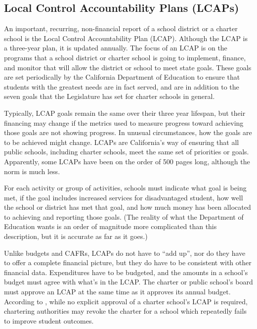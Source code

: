 \subsection{Local Control Accountability Plans (LCAPs)}\label{sec:lcaps}\indent%

An important, recurring, non-financial report of a school district or a charter school is the Local Control Accountability Plan (LCAP).
 Although the LCAP is a three-year plan, it is updated annually. The focus of an LCAP is on the programs that a school district or charter school is going to implement, finance, and monitor that will allow the district or school to meet state goals. These goals are set periodically by the California Department of Education to ensure that students with the greatest needs are in fact served, and are in addition to the seven goals that the Legislature has set for charter schools in general.

Typically, LCAP goals remain the same over their three year lifespan, but their financing may change if the metrics used to measure progress toward achieving those goals are not showing progress. In unusual circumstances, how the goals are to be achieved might change. LCAPs are California's way of ensuring that all public schools, including charter schools, meet the same set of priorities or goals. Apparently, some LCAPs have been on the order of 500 pages long, although the norm is much less.

For each activity or group of activities, schools must indicate what goal is being met, if the goal includes increased services for disadvantaged student, how well the school or district has met that goal, and how much money has been allocated to achieving and reporting those goals. (The reality of what the Department of Education wants is an order of magnitude more complicated than this description, but it is accurate as far as it goes.)

Unlike budgets and CAFRs, LCAPs do not have to ``add up'', nor do they have to offer a complete financial picture, but they do have to be consistent with other financial data. Expenditures have to be budgeted, and the amounts in a school's budget must agree with what's in the LCAP\@. The charter or public school's board must approve an LCAP at the same time as it approves its annual budget. According to \textcite[81]{Aguinaldo.etal2022}, while no explicit approval of a charter school's LCAP is required, chartering authorities may revoke the charter for a school which repeatedly fails to improve student outcomes.

